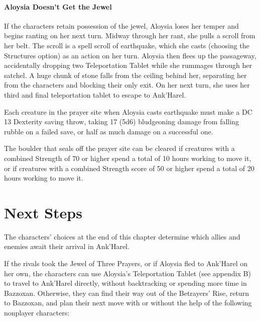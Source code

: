 \documentclass[10pt,a4paper,twoside,twocolumn,openany,nodeprecatedcode]{dndbook}
\begin{document}
\paragraph{Aloysia Doesn't Get the Jewel}
If the characters retain possession of the jewel, Aloysia loses her temper and begins ranting on her next turn. Midway through her rant, she pulls a scroll from her belt. The scroll is a spell scroll of earthquake, which she casts (choosing the Structures option) as an action on her turn. Aloysia then flees up the passageway, accidentally dropping two Teleportation Tablet while she rummages through her satchel. A huge chunk of stone falls from the ceiling behind her, separating her from the characters and blocking their only exit. On her next turn, she uses her third and final teleportation tablet to escape to Ank'Harel.

Each creature in the prayer site when Aloysia casts earthquake must make a DC 13 Dexterity saving throw, taking 17 (5d6) bludgeoning damage from falling rubble on a failed save, or half as much damage on a successful one.

The boulder that seals off the prayer site can be cleared if creatures with a combined Strength of 70 or higher spend a total of 10 hours working to move it, or if creatures with a combined Strength score of 50 or higher spend a total of 20 hours working to move it.

\section{Next Steps}
The characters' choices at the end of this chapter determine which allies and enemies await their arrival in Ank'Harel.

If the rivals took the Jewel of Three Prayers, or if Aloysia fled to Ank'Harel on her own, the characters can use Aloysia's Teleportation Tablet (see appendix B) to travel to Ank'Harel directly, without backtracking or spending more time in Bazzoxan. Otherwise, they can find their way out of the Betrayers' Rise, return to Bazzoxan, and plan their next move with or without the help of the following nonplayer characters:
\end{document}

